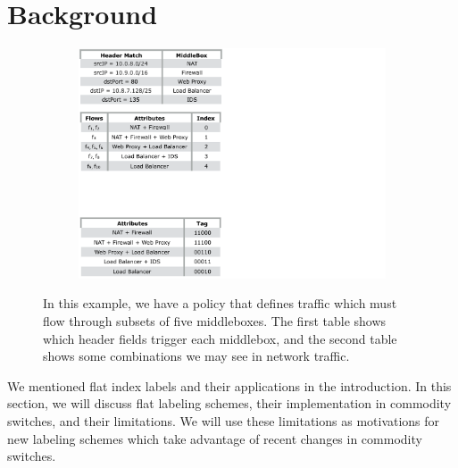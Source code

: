 \section{Background}

\begin{figure}[t!] 
\begin{minipage}{1\linewidth}
\begin{subfigure}[c]{0.96\linewidth}
\includegraphics[trim={0 12cm 19cm 0}, clip, width=\linewidth]{figures/mbox_path_example3}
\end{subfigure} 
\end{minipage} 
\caption{In this example, we have a policy that defines traffic which must flow through subsets of five middleboxes. The first table shows which header fields trigger each middlebox, and the second table shows some combinations we may see in network traffic. }
\label{fig:mbox_policies}
\end{figure}

We mentioned flat index labels and their applications in the introduction. In this section, we will discuss flat labeling schemes, their implementation in commodity switches, and their limitations. We will use these limitations as motivations for new labeling schemes which take advantage of recent changes in commodity switches.


